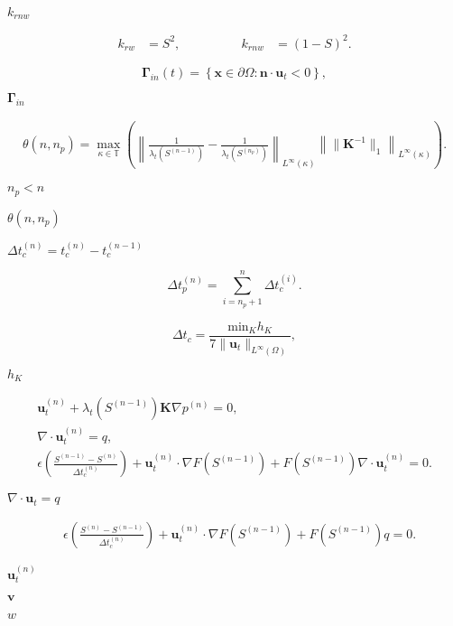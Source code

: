 \documentclass{article}
\begin{document}
$k_{rnw}$
\pagebreak

\begin{align*} k_{rw} &= S^2, \qquad&\qquad k_{rnw} &= \left( 1-S \right)^2. \end{align*}
\pagebreak

\[ \mathbf{\Gamma}_{in}(t) = \left\{\mathbf{x} \in \partial \Omega:\mathbf{n} \cdot \mathbf{u}_t<0\right\}, \]
\pagebreak

$\mathbf{\Gamma}_{in}$
\pagebreak

\begin{align*} \theta(n,n_p) = \max_{\kappa\in{\mathbb T}} \left( \left\| \frac 1{\lambda_t\left(S^{(n-1)}\right)} - \frac 1{\lambda_t\left(S^{(n_p)}\right)} \right\|_{L^\infty(\kappa)} \left\|\|\mathbf{K}^{-1}\|_1\right\|_{L^\infty(\kappa)} \right). \end{align*}
\pagebreak

$n_p<n$
\pagebreak

$\theta(n,n_p)$
\pagebreak

$\Delta t_c^{(n)}=t^{(n)}_c-t^{(n-1)}_c$
\pagebreak

\[ \Delta t_p^{(n)} = \sum_{i=n_p+1}^{n} \Delta t_c^{(i)}. \]
\pagebreak

\[ \Delta t_c = \frac{\textrm{min}_{K}h_{K}}{7 \|\mathbf{u}_t\|_{L^{\infty}\left(\Omega\right)}}, \]
\pagebreak

$h_K$
\pagebreak

\begin{align*} \mathbf{u}^{(n)}_t + \lambda_t\left(S^{(n-1)}\right) \mathbf{K} \nabla p^{(n)} =0, \\ \nabla \cdot \mathbf{u}^{(n)}_t = q, \\ \epsilon \left( \frac{S^{(n-1)}-S^{(n)}}{\Delta t^{(n)}_c} \right) + \mathbf{u}^{(n)}_t \cdot \nabla F\left(S^{(n-1)}\right) + F\left(S^{(n-1)}\right) \nabla \cdot \mathbf{u}^{(n)}_t =0. \end{align*}
\pagebreak

$\nabla \cdot \mathbf{u}_t = q$
\pagebreak

\begin{align*} &\epsilon \left( \frac{S^{(n)}-S^{(n-1)}}{\Delta t^{(n)}_c} \right) + \mathbf{u}^{(n)}_t \cdot \nabla F\left(S^{(n-1)}\right) + F\left(S^{(n-1)}\right)q=0. \end{align*}
\pagebreak

$\mathbf u_t^{(n)}$
\pagebreak

$\mathbf{v}$
\pagebreak

$w$
\pagebreak
\end{document}
